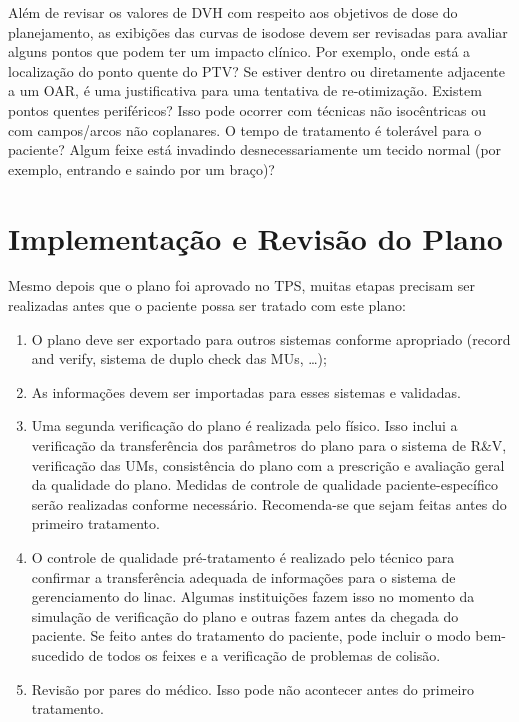 \documentclass[11pt,a4paper]{article}
\newcounter{exemplo}
\begin{document}
	Além de revisar os valores de DVH com respeito aos objetivos de dose do planejamento, as exibições das curvas de isodose devem ser revisadas para avaliar alguns pontos que podem ter um impacto clínico. Por exemplo, onde está a localização do ponto quente do PTV? Se estiver dentro ou diretamente adjacente a um OAR, é uma justificativa para uma tentativa de re-otimização. Existem pontos quentes periféricos? Isso pode ocorrer com técnicas não isocêntricas ou com  campos/arcos não coplanares. O tempo de tratamento é tolerável para o paciente? Algum feixe está invadindo desnecessariamente um tecido normal (por exemplo, entrando e saindo por um braço)?

\section{Implementação e Revisão do Plano}

	Mesmo depois que o plano foi aprovado no TPS, muitas etapas precisam ser realizadas antes que o paciente possa ser tratado com este plano:

	\begin{enumerate}[label=\textcolor{CarnationPink}{\arabic*${}^\circ$}]
		\item O plano deve ser exportado para outros sistemas conforme apropriado (record and verify, sistema de duplo check das MUs, \dots);
		\item As informações devem ser importadas para esses sistemas e validadas.
		\item Uma segunda verificação do plano é realizada pelo físico. Isso inclui a verificação da transferência dos parâmetros do plano para o sistema de R\&V, verificação das UMs, consistência do plano com a prescrição e avaliação geral da qualidade do plano. Medidas de controle de qualidade paciente-específico serão realizadas conforme necessário. Recomenda-se que sejam feitas antes do primeiro tratamento.
		\item O controle de qualidade pré-tratamento é realizado pelo técnico para confirmar a transferência adequada de informações para o sistema de gerenciamento do linac. Algumas instituições fazem isso no momento da simulação de verificação do plano e outras fazem antes da chegada do paciente. Se feito antes do tratamento do paciente, pode incluir o modo bem-sucedido de todos os feixes e a verificação de problemas de colisão.
		\item Revisão por pares do médico. Isso pode não acontecer antes do primeiro tratamento.
	\end{enumerate}
\end{document}
